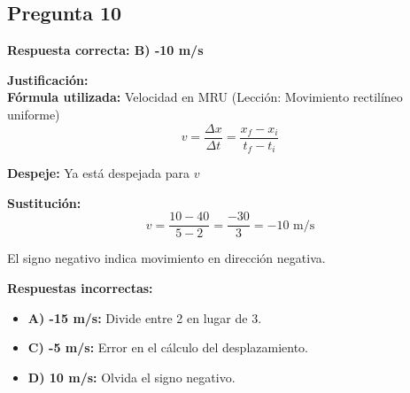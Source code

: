 \begin{respuestabox}
\subsection{Pregunta 10}
\textcolor{verdecorrecto}{\textbf{Respuesta correcta: B) -10 m/s}}

\textbf{Justificación:}\\
\textbf{Fórmula utilizada:} Velocidad en MRU (Lección: Movimiento rectilíneo uniforme)
$$v = \frac{\Delta x}{\Delta t} = \frac{x_f - x_i}{t_f - t_i}$$

\textbf{Despeje:} Ya está despejada para $v$

\textbf{Sustitución:}
$$v = \frac{10 - 40}{5 - 2} = \frac{-30}{3} = -10 \text{ m/s}$$

El signo negativo indica movimiento en dirección negativa.

\textbf{Respuestas incorrectas:}
\begin{itemize}
    \item \textbf{A) -15 m/s:} Divide entre 2 en lugar de 3.
    \item \textbf{C) -5 m/s:} Error en el cálculo del desplazamiento.
    \item \textbf{D) 10 m/s:} Olvida el signo negativo.
\end{itemize}
\end{respuestabox}

\newpage

